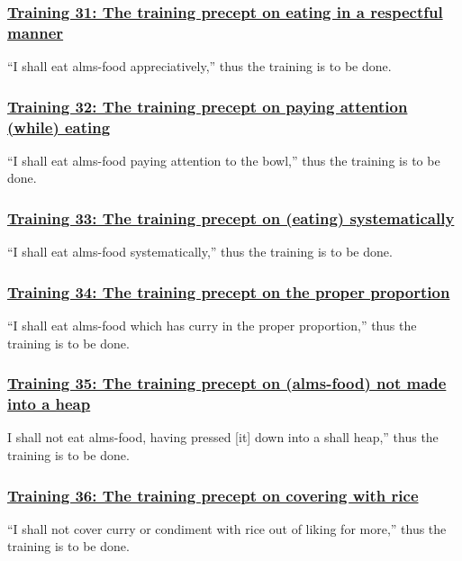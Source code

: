 \subsubsection*{\hyperref[sekh31]{Training 31: The training precept on eating in a respectful manner}}
\label{training31}
``I shall eat alms-food appreciatively,'' thus the training is to be done.



\subsubsection*{\hyperref[sekh32]{Training 32: The training precept on paying attention (while) eating}}
\label{training32}
``I shall eat alms-food paying attention to the bowl,'' thus the training is to be done.



\subsubsection*{\hyperref[sekh33]{Training 33: The training precept on (eating) systematically}}
\label{training33}
``I shall eat alms-food systematically,'' thus the training is to be done.



\subsubsection*{\hyperref[sekh34]{Training 34: The training precept on the proper proportion}}
\label{training34}
``I shall eat alms-food which has curry in the proper proportion,'' thus the training is to be done.



\subsubsection*{\hyperref[sekh35]{Training 35: The training precept on (alms-food) not made into a heap}}
\label{training35}
I shall not eat alms-food, having pressed [it] down into a shall heap,'' thus the training is to be done.



\subsubsection*{\hyperref[sekh36]{Training 36: The training precept on covering with rice}}
\label{training36}
``I shall not cover curry or condiment with rice out of liking for more,'' thus the training is to be done.



